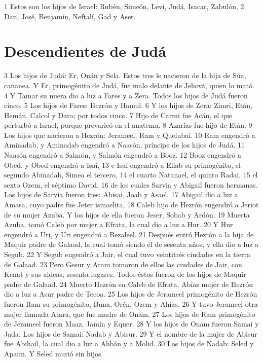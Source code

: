 1 Estos son los hijos de Israel: Rubén, Simeón, Leví, Judá, Isacar, Zabulón,
2 Dan, José, Benjamín, Neftalí, Gad y Aser.

\section*{Descendientes de Judá}

3 Los hijos de Judá: Er, Onán y Sela. Estos tres le nacieron de la hija de Súa, cananea. Y Er, primogénito de Judá, fue malo delante de Jehová, quien lo mató.
4 Y Tamar su nuera dio a luz a Fares y a Zera. Todos los hijos de Judá fueron cinco.
5 Los hijos de Fares: Hezrón y Hamul.
6 Y los hijos de Zera: Zimri, Etán, Hemán, Calcol y Dara; por todos cinco.
7 Hijo de Carmi fue Acán, el que perturbó a Israel, porque prevaricó en el anatema.
8 Azarías fue hijo de Etán.
9 Los hijos que nacieron a Hezrón: Jerameel, Ram y Quelubai.
10 Ram engendró a Aminadab, y Aminadab engendró a Naasón, príncipe de los hijos de Judá.
11 Naasón engendró a Salmón, y Salmón engendró a Booz.
12 Booz engendró a Obed, y Obed engendró a Isaí,
13 e Isaí engendró a Eliab su primogénito, el segundo Abinadab, Simea el tercero,
14 el cuarto Natanael, el quinto Radai,
15 el sexto Ozem, el séptimo David, 
16 de los cuales Sarvia y Abigail fueron hermanas. Los hijos de Sarvia fueron tres: Abisai, Joab y Asael.
17 Abigail dio a luz a Amasa, cuyo padre fue Jeter ismaelita,
18 Caleb hijo de Hezrón engendró a Jeriot de su mujer Azuba. Y los hijos de ella fueron Jeser, Sobab y Ardón.
19 Muerta Azuba, tomó Caleb por mujer a Efrata, la cual dio a luz a Hur.
20 Y Hur engendró a Uri, y Uri engendró a Bezaleel.
21 Después entró Hezrón a la hija de Maquir padre de Galaad, la cual tomó siendo él de sesenta años, y ella dio a luz a Segub.
22 Y Segub engendró a Jair, el cual tuvo veintitrés ciudades en la tierra de Galaad.
23 Pero Gesur y Aram tomaron de ellos las ciudades de Jair, con Kenat y sus aldeas, sesenta lugares. Todos éstos fueron de los hijos de Maquir padre de Galaad.
24 Muerto Hezrón en Caleb de Efrata, Abías mujer de Hezrón dio a luz a Asur padre de Tecoa.
25 Los hijos de Jerameel primogénito de Hezrón fueron Ram su primogénito, Buna, Orén, Ozem y Ahías.
26 Y tuvo Jerameel otra mujer llamada Atara, que fue madre de Onam.
27 Los hijos de Ram primogénito de Jerameel fueron Maaz, Jamín y Equer.
28 Y los hijos de Onam fueron Samai y Jada. Los hijos de Samai: Nadab y Abisur.
29 Y el nombre de la mujer de Abisur fue Abihail, la cual dio a luz a Ahbán y a Molid.
30 Los hijos de Nadab: Seled y Apaim. Y Seled murió sin hijos.

